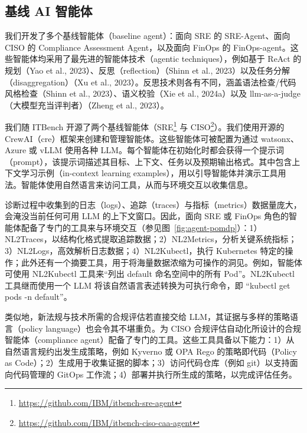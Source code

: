 \documentclass[10pt,UTF8,fontset=fandol]{ctexart}
\begin{document}
\subsection{基线 AI 智能体}

我们开发了多个基线智能体（baseline agent）：面向 SRE 的 SRE-Agent、面向 CISO 的 Compliance Assessment Agent，以及面向 FinOps 的 FinOps-agent。这些智能体均采用了最先进的智能体技术（agentic techniques），例如基于 ReAct 的规划（Yao et al., 2023）、反思（reflection）（Shinn et al., 2023）以及任务分解（disaggregation）（Xu et al., 2023）。反思技术则各有不同，涵盖语法检查/代码风格检查（Shinn et al., 2023）、语义校验（Xie et al., 2024a）以及 llm-as-a-judge（大模型充当评判者）（Zheng et al., 2023）。

我们随 ITBench 开源了两个基线智能体（SRE\footnote{\url{https://github.com/IBM/itbench-sre-agent}} 与 CISO\footnote{\url{https://github.com/IBM/itbench-ciso-caa-agent}}）。我们使用开源的 CrewAI（cre）框架来创建和管理智能体。这些智能体可被配置为通过 watsonx、Azure 或 vLLM 使用各种 LLM。每个智能体在初始化时都会获得一个提示词（prompt），该提示词描述其目标、上下文、任务以及预期输出格式。其中包含上下文学习示例（in-context learning examples），用以引导智能体并演示工具用法。智能体使用自然语言来访问工具，从而与环境交互以收集信息。

诊断过程中收集到的日志（logs）、追踪（traces）与指标（metrics）数据量庞大，会淹没当前任何可用 LLM 的上下文窗口。因此，面向 SRE 或 FinOps 角色的智能体配备了专门的工具来与环境交互（参见图~\ref{fig:agent-pomdp}）：1）NL2Traces，以结构化格式提取追踪数据；2）NL2Metrics，分析关键系统指标；3）NL2Logs，高效解析日志数据；4）NL2Kubectl，执行 Kubernetes 特定的操作；此外还有一个摘要工具，用于将海量数据浓缩为可操作的洞见。例如，智能体可使用 NL2Kubectl 工具来“列出 default 命名空间中的所有 Pod”。NL2Kubectl 工具继而使用一个 LLM 将该自然语言表述转换为可执行命令，即 “kubectl get pods -n default”。

类似地，新法规与技术所需的合规评估若直接交给 LLM，其证据与多样的策略语言（policy language）也会令其不堪重负。为 CISO 合规评估自动化所设计的合规智能体（compliance agent）配备了专门的工具。这些工具具备以下能力：1）从自然语言规约出发生成策略，例如 Kyverno 或 OPA Rego 的策略即代码（Policy as Code）；2）生成用于收集证据的脚本；3）访问代码仓库（例如 git）以支持面向代码管理的 GitOps 工作流；4）部署并执行所生成的策略，以完成评估任务。
\end{document}
